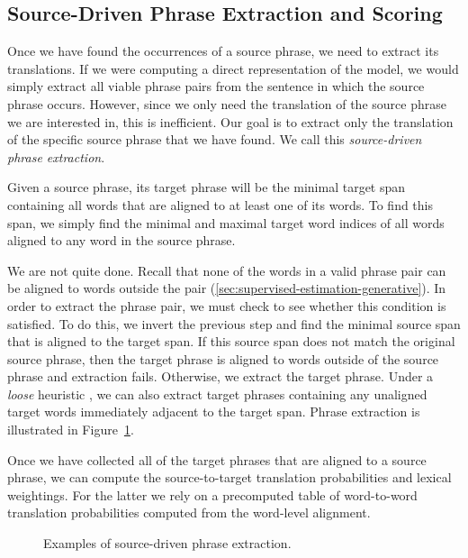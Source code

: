 \subsection{Source-Driven Phrase Extraction and Scoring}\label{sec:source-driven-rule-extraction}

Once we have found the occurrences of a source phrase, we need to
extract its translations.  If we were computing a direct representation
of the model, we would simply extract all viable phrase pairs from the
sentence in which the source phrase occurs.  However, since we only
need the translation of the source phrase we are interested in,
this is inefficient.  Our goal is to extract only the translation
of the specific source phrase that we have found.  
We call this {\em source-driven phrase extraction}.

Given a source phrase, its target phrase will be the minimal
target span containing all words that are aligned to at least 
one of its words.  To find this span, we simply find the 
minimal and maximal target word indices of all words aligned
to any word in the source phrase.

We are not quite done.  Recall that none of the words in a valid
phrase pair can be aligned to words outside the pair 
(\textsection\ref{sec:supervised-estimation-generative}).
In order to extract the phrase pair,
we must check to see whether this condition is satisfied.
To do this, we invert the previous step and
find the minimal source span that is aligned
to the target span.  If this source span does not match the 
original source phrase, then the target phrase is aligned to
words outside of the source phrase and extraction fails.  Otherwise,
we extract the target phrase.  Under a {\em loose} heuristic \citep{Ayan:2006:acl-coling},
we can also extract target phrases containing any unaligned
target words immediately adjacent to the target span.  Phrase
extraction is illustrated in Figure~\ref{fig:phrase-extraction}.

Once we have collected all of the target phrases that are aligned
to a source phrase, we can compute the source-to-target translation
probabilities and lexical weightings.  For the latter we rely on
a precomputed table of word-to-word translation probabilities computed
from the word-level alignment.

\figpreamble
\begin{figure}
	\figfontsize{
	\begin{center}
		
	\end{center}}
	\figpostamble
	\caption{Examples of source-driven phrase extraction.}
	\label{fig:phrase-extraction}
\end{figure}

